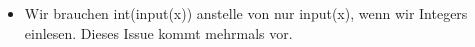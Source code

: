 \begin{itemize}
	\item Wir brauchen int(input(x)) anstelle von nur input(x), wenn wir Integers einlesen. Dieses Issue kommt mehrmals vor.
\end{itemize}


